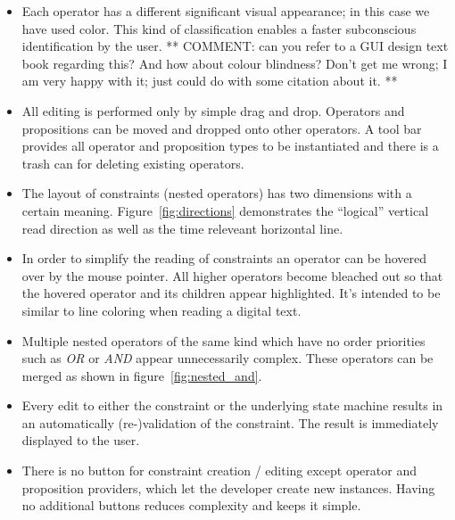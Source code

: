 \documentclass[conference]{IEEEtran}
\begin{document}
\begin{itemize}
	\item Each operator has a different significant visual appearance; in this case we have used color. This kind of classification enables a faster subconscious identification by the user. ** COMMENT: can you refer to a GUI design text book regarding this? And how about colour blindness? Don't get me wrong; I am very happy with it; just could do with some citation about it. **
	\item All editing is performed only by simple drag and drop. Operators and propositions can be moved and dropped onto other operators. A tool bar provides all operator and proposition types to be instantiated and there is a trash can for deleting existing operators.
	\item The layout of constraints (nested operators) has two dimensions with a certain meaning. Figure~\ref{fig:directions} demonstrates the ``logical'' vertical read direction as well as the time releveant horizontal line.
	\item In order to simplify the reading of constraints an operator can be hovered over by the mouse pointer. All higher operators become bleached out so that the hovered operator and its children appear highlighted. It's intended to be similar to line coloring when reading a digital text.
	\item Multiple nested operators of the same kind which have no order priorities such as \emph{OR} or \emph{AND} appear unnecessarily complex. These operators can be merged as shown in figure~\ref{fig:nested_and}.
	\item Every edit to either the constraint or the underlying state machine results in an automatically (re-)validation of the constraint. The result is immediately displayed to the user.
	\item There is no button for constraint creation / editing except operator and proposition providers, which let the developer create new instances. Having no additional buttons reduces complexity and keeps it simple.
\end{itemize}
\end{document}
